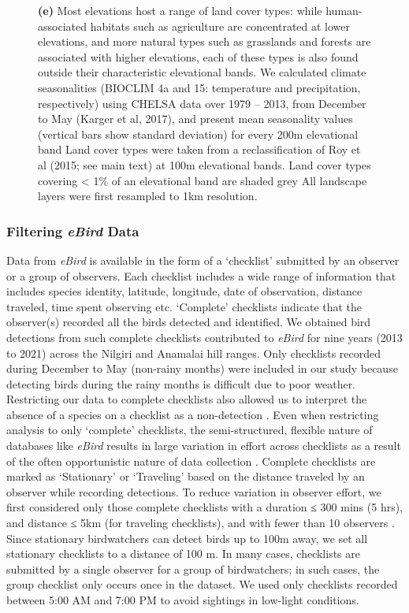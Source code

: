 \begin{figure}[h!]
{        \textbf{(e)} Most elevations host a range of land cover types: while human-associated habitats such as agriculture are concentrated at lower elevations, and more natural types such as grasslands and forests are associated with higher elevations, each of these types is also found outside their characteristic elevational bands.
        We calculated climate seasonalities (BIOCLIM 4a and 15: temperature and precipitation, respectively) using CHELSA data over 1979 -- 2013, from December to May (Karger et al, 2017), and present mean seasonality values (vertical bars show standard deviation) for every 200m elevational band
        Land cover types were taken from a reclassification of Roy et al
        (2015; see main text) at 100m elevational bands.
        Land cover types covering < 1\% of an elevational band are shaded grey
        All landscape layers were first resampled to 1km resolution.
    }
    \label{hilly_fig_02}
\end{figure}

\subsubsection*{Filtering \textit{eBird} Data}

Data from \textit{eBird} is available in the form of a `checklist' submitted by an observer or a group of observers.
Each checklist includes a wide range of information that includes species identity, latitude, longitude, date of observation, distance traveled, time spent observing etc.
`Complete' checklists indicate that the observer(s) recorded all the birds detected and identified.
We obtained bird detections from such complete checklists contributed to \textit{eBird} for nine years (2013 to 2021) across the Nilgiri and Anamalai hill ranges.
Only checklists recorded during December to May (non-rainy months) were included in our study because detecting birds during the rainy months is difficult due to poor weather.
Restricting our data to complete checklists also allowed us to interpret the absence of a species on a checklist as a non-detection \citep[called zero-filling][]{johnston2021}.
Even when restricting analysis to only `complete' checklists, the semi-structured, flexible nature of databases like \textit{eBird} results in large variation in effort across checklists as a result of the often opportunistic nature of data collection \citep{kelling2019}.
Complete checklists are marked as `Stationary' or `Traveling' based on the distance traveled by an observer while recording detections.
To reduce variation in observer effort, we first considered only those complete checklists with a duration ≤ 300 mins (5 hrs), and distance ≤ 5km (for traveling checklists), and with fewer than 10 observers \citep[following][]{johnston2019}.
Since stationary birdwatchers can detect birds up to 100m away, we set all stationary checklists to a distance of 100 m.
In many cases, checklists are submitted by a single observer for a group of birdwatchers; in such cases, the group checklist only occurs once in the dataset.
We used only checklists recorded between 5:00 AM and 7:00 PM to avoid sightings in low-light conditions.

